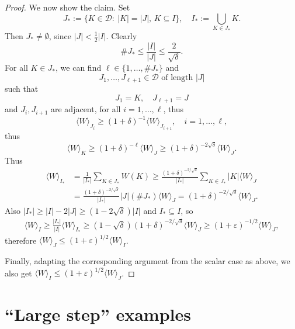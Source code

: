 \documentclass{amsart}
\newcommand{\cD}{\mathcal{D}}
\newcommand{\e}{\varepsilon}
\theoremstyle{definition}
\theoremstyle{remark}
\begin{document}
\begin{proof}
		We now show the claim. Set
		\begin{equation*}
			J_{*}:=\{K\in\cD:~|K|=|J|,\,K\subseteq I\},\quad I_{*}:=\bigcup_{K\in J_{*}}K.
		\end{equation*}
		Then $J_{*}\neq\emptyset$, since $|J|<\frac{1}{2}|I|$. Clearly
		\begin{equation*}
			\# J_{*}\leq\frac{|I|}{|J|}\leq\frac{2}{\sqrt{\delta}}.
		\end{equation*}
		For all $K\in J_{*}$, we can find $\ell\in\{1,\ldots,\#J_{*}\}$ and
		\begin{equation*}
			J_1,\ldots,J_{\ell+1}\in\cD\text{ of length }|J|
		\end{equation*}
		such that
		\begin{equation*}
			J_1=K,\quad J_{\ell+1}=J
		\end{equation*}
		and $J_i,J_{i+1}$ are adjacent, for all $i=1,\ldots,\ell$, thus
		\begin{equation*}
			\langle W\rangle_{J_i}\geq(1+\delta)^{-1}\langle W\rangle_{J_{i+1}},\quad i=1,\ldots,\ell,
		\end{equation*}
		thus
		\begin{equation*}
			\langle W\rangle_{K}\geq(1+\delta)^{-\ell}\langle W\rangle_{J}\geq(1+\delta)^{-2\sqrt{\delta}}\langle W\rangle_{J}.
		\end{equation*}
		Thus
		\begin{align*}
			\langle W\rangle_{I_{*}}&=\frac{1}{|I_{*}|}\sum_{K\in J_{*}}W(K)\geq\frac{(1+\delta)^{-2/\sqrt{\delta}}}{|I_{*}|}\sum_{K\in J_{*}}|K|\langle W\rangle_{J}\\
			&=\frac{(1+\delta)^{-2/\sqrt{\delta}}}{|I_{*}|}|J|(\# J_{*})\langle W\rangle_{J}
			=(1+\delta)^{-2/\sqrt{\delta}}\langle W\rangle_{J}.
		\end{align*}
		Also $|I_{*}|\geq|I|-2|J|\geq(1-2\sqrt{\delta})|I|$ and $I_{*}\subseteq I$, so
		\begin{align*}
			\langle W\rangle_{I}\geq\frac{|I_{*}|}{|I|}\langle W\rangle_{I_{*}}\geq
			(1-\sqrt{\delta})(1+\delta)^{-2/\sqrt{\delta}}\langle W\rangle_{J}\geq(1+\e)^{-1/2}\langle W\rangle_{J},
		\end{align*}
		therefore $\langle W\rangle_{J}\leq(1+\e)^{1/2}\langle W\rangle_{I}$.
		
		Finally, adapting the corresponding argument from the scalar case as above, we also get $\langle W\rangle_{I}\leq(1+\e)^{1/2}\langle W\rangle_{J}$.
	\end{proof}
	
\section{``Large step'' examples}
\label{sec:large_step_examples}
\end{document}
